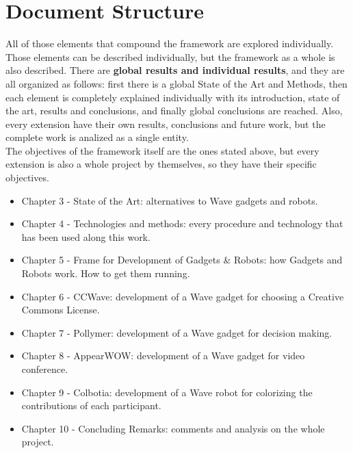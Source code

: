 \section{Document Structure}
All of those elements that compound the framework are explored individually. Those elements can be described individually, but the framework as a whole is also described. There are \textbf{global results and individual results}, and they are all organized as follows: first there is a global State of the Art and Methods, then each element is completely explained individually with its introduction, state of the art, results and conclusions, and finally global conclusions are reached. Also, every extension have their own results, conclusions and future work, but the complete work is analized as a single entity.\\[.2cm]
The objectives of the framework itself are the ones stated above, but every extension is also a whole project by themselves, so they have their specific objectives.
\begin{itemize}
  \item Chapter 3 - State of the Art: alternatives to Wave gadgets and robots.
  \item Chapter 4 - Technologies and methods: every procedure and technology that has been used along this work.
  \item Chapter 5 - Frame for Development of Gadgets \& Robots: how Gadgets and Robots work. How to get them running.
  \item Chapter 6 - CCWave: development of a Wave gadget for choosing a Creative Commons License.
  \item Chapter 7 - Pollymer: development of a Wave gadget for decision making.
  \item Chapter 8 - AppearWOW: development of a Wave gadget for video conference.
  \item Chapter 9 - Colbotia: development of a Wave robot for colorizing the contributions of each participant.
  \item Chapter 10 - Concluding Remarks: comments and analysis on the whole project.
\end{itemize}

\newpage
\thispagestyle{sectioned}
